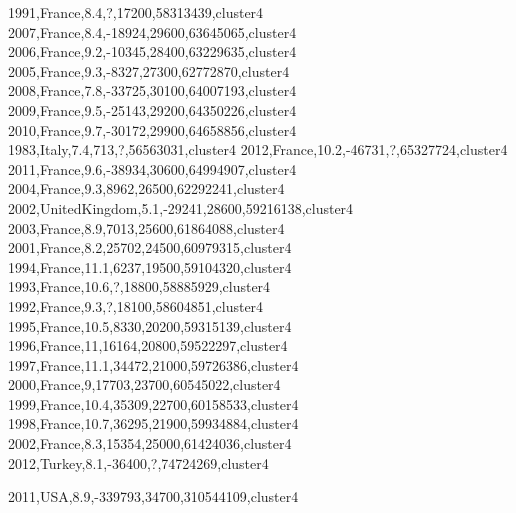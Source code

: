 1991,France,8.4,?,17200,58313439,cluster4
2007,France,8.4,-18924,29600,63645065,cluster4
2006,France,9.2,-10345,28400,63229635,cluster4
2005,France,9.3,-8327,27300,62772870,cluster4
2008,France,7.8,-33725,30100,64007193,cluster4
2009,France,9.5,-25143,29200,64350226,cluster4
2010,France,9.7,-30172,29900,64658856,cluster4
1983,Italy,7.4,713,?,56563031,cluster4
2012,France,10.2,-46731,?,65327724,cluster4
2011,France,9.6,-38934,30600,64994907,cluster4
2004,France,9.3,8962,26500,62292241,cluster4
2002,UnitedKingdom,5.1,-29241,28600,59216138,cluster4
2003,France,8.9,7013,25600,61864088,cluster4
2001,France,8.2,25702,24500,60979315,cluster4
1994,France,11.1,6237,19500,59104320,cluster4
1993,France,10.6,?,18800,58885929,cluster4
1992,France,9.3,?,18100,58604851,cluster4
1995,France,10.5,8330,20200,59315139,cluster4
1996,France,11,16164,20800,59522297,cluster4
1997,France,11.1,34472,21000,59726386,cluster4
2000,France,9,17703,23700,60545022,cluster4
1999,France,10.4,35309,22700,60158533,cluster4
1998,France,10.7,36295,21900,59934884,cluster4
2002,France,8.3,15354,25000,61424036,cluster4
2012,Turkey,8.1,-36400,?,74724269,cluster4

2011,USA,8.9,-339793,34700,310544109,cluster4